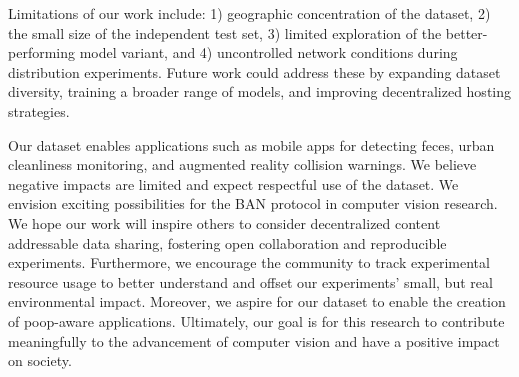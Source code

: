 \documentclass{article}
\newif\ifnonanonymous
\newif\ifuseappendix
\newif\ifuseacknowledgement
\newcommand{\redact}[1]{%
    \ifnonanonymous
        #1%
    \else
        [redacted for peer review]%
    \fi
}
\begin{document}
Limitations of our work include:
1) geographic concentration of the dataset,
2) the small size of the independent test set,
3) limited exploration of the better-performing model variant, and
4) uncontrolled network conditions during distribution experiments.
Future work could address these by expanding dataset diversity, training a
broader range of models, and improving decentralized hosting strategies.

Our dataset enables applications such as mobile apps for detecting feces, urban
cleanliness monitoring, and augmented reality collision warnings. We believe
negative impacts are limited and expect respectful use of the dataset.
We envision exciting possibilities for the BAN protocol in computer vision research.
We hope our work will inspire others to consider decentralized content addressable data sharing, fostering
  open collaboration and reproducible experiments.
Furthermore, we encourage the community to track experimental resource usage to better understand and offset
  our experiments' small, but real environmental impact.
Moreover, we aspire for our dataset to enable the creation of poop-aware applications.
Ultimately, our goal is for this research to contribute meaningfully to the advancement of computer vision
  and have a positive impact on society.
  
  
\ifuseacknowledgement
\section{Acknowledgements}
We would would like to thank all of the dogs that produced subject matter for the dataset, all of the
contributors for helping to construct a challenging test set, and \redact{Anthony Hoogs} for several suggestions including taking the 
  third negative picture.
This work is dedicated to \redact{Bezoar}, a very weird and very good girl.

\fi

{\small


}


\ifuseappendix

%
\fi
\end{document}
